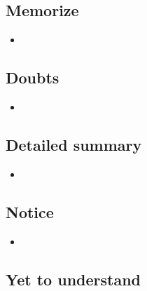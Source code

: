 \documentclass{article}
\begin{document}
\subsection{Memorize}

    \begin{itemize}

    \item {}
    
    \end{itemize}

\subsection{Doubts}

    \begin{itemize}

    \item 
    
    \end{itemize}

\subsection{Detailed summary}

    \begin{itemize}

    \item 
    
    \end{itemize}

\subsection{Notice}

    \begin{itemize}

    \item 
    
    \end{itemize}

\subsection{Yet to understand}
\end{document}
